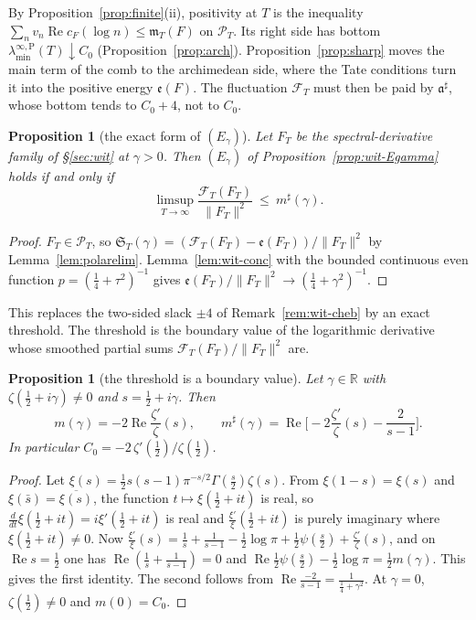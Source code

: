\documentclass[11pt]{amsart}
\newtheorem{proposition}[theorem]{Proposition}
\theoremstyle{definition}
\theoremstyle{remark}
\newcommand{\R}{\mathbb R}
\newcommand{\Rel}{\operatorname{Re}}
\newcommand{\PT}{\mathcal P_T}
\newcommand{\cF}{c_F}
\newcommand{\mT}{\mathfrak m_T}
\newcommand{\laminfP}{\lambda^{\infty,\mathrm P}_{\min}}
\begin{document}
By Proposition~\ref{prop:finite}(ii), positivity at $T$ is the inequality
$\sum_nv_n\Rel\cF(\log n)\le\mT(F)$ on $\PT$. Its right side has bottom $\laminfP(T)\downarrow C_0$
(Proposition~\ref{prop:arch}). Proposition~\ref{prop:sharp} moves the main term of the comb to the archimedean side, where the
Tate conditions turn it into the positive energy $\mathfrak e(F)$. The fluctuation $\mathcal F_T$ must then be paid by
$\mathfrak a^\sharp$, whose bottom tends to $C_0+4$, not to $C_0$.

\begin{proposition}[the exact form of $(E_\gamma)$]\label{prop:Egamma-exact}
Let $F_T$ be the spectral-derivative family of \S\ref{sec:wit} at $\gamma>0$. Then $(E_\gamma)$ of
Proposition~\ref{prop:wit-Egamma} holds if and only if
\[
\limsup_{T\to\infty}\frac{\mathcal F_T(F_T)}{\|F_T\|^2}\ \le\ m^\sharp(\gamma).
\]
\end{proposition}

\begin{proof}
$F_T\in\PT$, so $\mathfrak S_T(\gamma)=(\mathcal F_T(F_T)-\mathfrak e(F_T))/\|F_T\|^2$ by Lemma~\ref{lem:polarelim}. Lemma~\ref{lem:wit-conc}
with the bounded continuous even function $p=(\frac14+\tau^2)^{-1}$ gives $\mathfrak e(F_T)/\|F_T\|^2\to(\frac14+\gamma^2)^{-1}$.
\end{proof}

This replaces the two-sided slack $\pm4$ of Remark~\ref{rem:wit-cheb} by an exact threshold. The threshold is the
boundary value of the logarithmic derivative whose smoothed partial sums $\mathcal F_T(F_T)/\|F_T\|^2$ are.

\begin{proposition}[the threshold is a boundary value]\label{prop:boundary}
Let $\gamma\in\R$ with $\zeta(\frac12+i\gamma)\ne0$ and $s=\frac12+i\gamma$. Then
\[
m(\gamma)=-2\Rel\frac{\zeta'}{\zeta}(s),\qquad m^\sharp(\gamma)=\Rel\Big[-2\frac{\zeta'}{\zeta}(s)-\frac2{s-1}\Big].
\]
In particular $C_0=-2\,\zeta'(\frac12)/\zeta(\frac12)$.
\end{proposition}

\begin{proof}
Let $\xi(s)=\frac12s(s-1)\pi^{-s/2}\Gamma(\frac s2)\zeta(s)$. From $\xi(1-s)=\xi(s)$ and $\xi(\bar s)=\overline{\xi(s)}$, the function
$t\mapsto\xi(\frac12+it)$ is real, so $\frac{d}{dt}\xi(\frac12+it)=i\xi'(\frac12+it)$ is real and $\frac{\xi'}{\xi}(\frac12+it)$ is purely
imaginary where $\xi(\frac12+it)\ne0$. Now $\frac{\xi'}{\xi}(s)=\frac1s+\frac1{s-1}-\frac12\log\pi+\frac12\psi(\frac s2)+\frac{\zeta'}{\zeta}(s)$, and on
$\Rel s=\frac12$ one has $\Rel(\frac1s+\frac1{s-1})=0$ and $\Rel\frac12\psi(\frac s2)-\frac12\log\pi=\frac12m(\gamma)$. This gives the first
identity. The second follows from $\Rel\frac{-2}{s-1}=\frac1{\frac14+\gamma^2}$. At $\gamma=0$, $\zeta(\frac12)\ne0$ and $m(0)=C_0$.
\end{proof}
\end{document}
